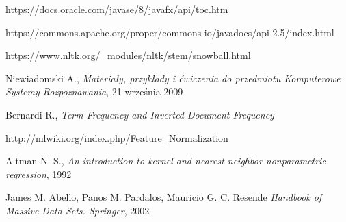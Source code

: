 \documentclass{classrep}
\begin{document}
\begin{thebibliography}{0}

https://docs.oracle.com/javase/8/javafx/api/toc.htm

https://commons.apache.org/proper/commons-io/javadocs/api-2.5/index.html

https://www.nltk.org/_modules/nltk/stem/snowball.html

Niewiadomski A., \textit{Materiały, przykłady i ćwiczenia do przedmiotu Komputerowe Systemy Rozpoznawania}, 21 września 2009 

Bernardi R., \textit{Term Frequency and Inverted Document Frequency}

http://mlwiki.org/index.php/Feature_Normalization

Altman N. S., \textit{An introduction to kernel and nearest-neighbor nonparametric regression}, 1992

James M. Abello, Panos M. Pardalos, Mauricio G. C. Resende \textit{Handbook of Massive Data Sets. Springer}, 2002

\end{thebibliography}
\end{document}
